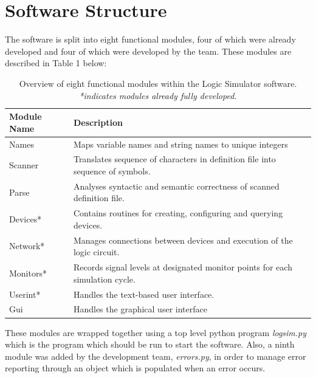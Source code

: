 \documentclass{article}					%
\begin{document}
\section{Software Structure}
The software is split into eight functional modules, four of which were already developed and four of which were developed by the team. These modules are described in Table 1 below:
\begin{table}[h]
\begin{centering}
\begin{tabular}{l|l}
Module Name & Description                                                                    \\ \hline
Names       & Maps variable names and string names to unique integers                        \\
Scanner     & Translates sequence of characters in definition file into sequence of symbols. \\
Parse       & Analyses syntactic and semantic correctness of scanned definition file.        \\
Devices*    & Contains routines for creating, configuring and querying devices.              \\
Network*    & Manages connections between devices and execution of the logic circuit.        \\
Monitors*   & Records signal levels at designated monitor points for each simulation cycle.  \\
Userint*    & Handles the text-based user interface.                                         \\
Gui         & Handles the graphical user interface
\end{tabular}
\caption{Overview of eight functional modules within the Logic Simulator software. \textit{*indicates modules already fully developed.}}
\end{centering}
\end{table}

These modules are wrapped together using a top level python program \textit{logsim.py} which is the program which should be run to start the software. Also, a ninth module was added by the development team, \textit{errors.py}, in order to manage error reporting through an object which is populated when an error occurs.
\end{document}

